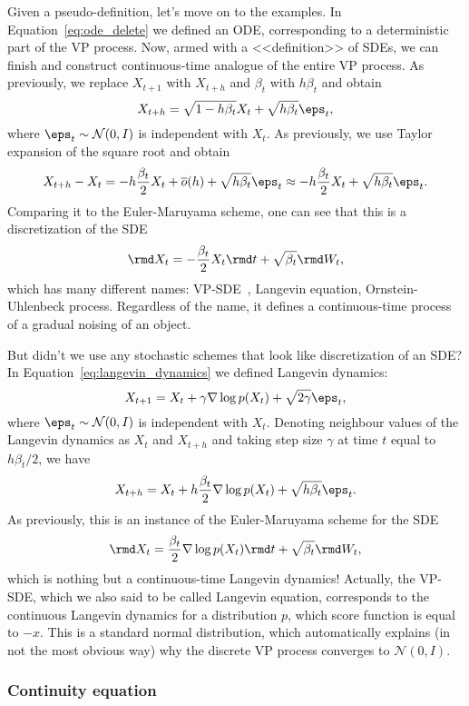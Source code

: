 Given a pseudo-definition, let's move on to the examples. In Equation~\ref{eq:ode_delete} we defined an ODE, corresponding to a deterministic part of the VP process. Now, armed with a <<definition>> of SDEs, we can finish and construct continuous-time analogue of the entire VP process. As previously, we replace $X_{t + 1}$ with $X_{t + h}$ and $\beta_t$ with $h \beta_t$ and obtain
\[
    X_{t + h} = \sqrt{1 - h\beta_t} X_t + \sqrt{h\beta_t} \eps_t,
\]
where $\eps_t \sim \mathcal{N}(0, I)$ is independent with $X_t$. As previously, we use Taylor expansion of the square root and obtain
\[
    X_{t + h} - X_{t} = -h\frac{\beta_t}{2} X_t + \overline{o}(h) + \sqrt{h\beta_t}\eps_t \approx -h \frac{\beta_t}{2} X_t + \sqrt{h \beta_t} \eps_t.
\]
Comparing it to the Euler-Maruyama scheme, one can see that this is a discretization of the SDE
\begin{equation}\label{eq:vp_sde}
    \rmd X_t = -\frac{\beta_t}{2} X_t \rmd t + \sqrt{\beta_t} \rmd W_t,
\end{equation}
which has many different names: VP-SDE~\cite{song2020score}, Langevin equation, Ornstein-Uhlenbeck process. Regardless of the name, it defines a continuous-time process of a gradual noising of an object.

But didn't we use any stochastic schemes that look like discretization of an SDE? In Equation~\ref{eq:langevin_dynamics} we defined Langevin dynamics:
\[
    X_{t + 1} = X_t + \gamma \nabla \log p(X_t) + \sqrt{2 \gamma} \eps_t,
\]
where $\eps_t \sim \mathcal{N}(0, I)$ is independent with $X_t$. Denoting neighbour values of the Langevin dynamics as $X_t$ and $X_{t + h}$ and taking step size $\gamma$ at time $t$ equal to $h \beta_t/2$, we have
\[
    X_{t + h} = X_t + h\frac{\beta_t}{2} \nabla \log p(X_t) + \sqrt{h \beta_t} \eps_t.
\]
As previously, this is an instance of the Euler-Maruyama scheme for the SDE
\begin{equation}\label{eq:continuous_langevin_dynamics}
    \rmd X_t = \frac{\beta_t}{2} \nabla \log p(X_t) \rmd t + \sqrt{\beta_t} \rmd W_t,
\end{equation}
which is nothing but a continuous-time Langevin dynamics! Actually, the VP-SDE, which we also said to be called Langevin equation, corresponds to the continuous Langevin dynamics for a distribution $p$, which score function is equal to $-x$. This is a standard normal distribution, which automatically explains (in not the most obvious way) why the discrete VP process converges to $\mathcal{N}(0, I)$.

\subsubsection{Continuity equation}

